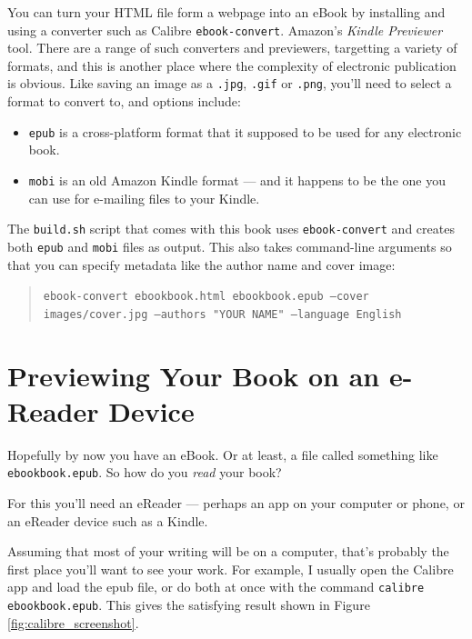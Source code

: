 You can turn your HTML file form a webpage into an eBook by installing
and using a converter such as Calibre \texttt{ebook-convert}.
Amazon's {\em Kindle Previewer} tool.
There are a range of such converters and previewers, targetting a
variety of formats, and this is another place where the complexity of
electronic publication is obvious. Like saving an image as a
\texttt{.jpg}, \texttt{.gif} or \texttt{.png}, you'll need to select a
format to convert to, and options include:

\begin{itemize}
  \item \texttt{epub} is a cross-platform format that it supposed to
    be used for any electronic book.
  \item \texttt{mobi} is an old Amazon Kindle format --- and it
    happens to be the one you can use for e-mailing files to your Kindle.
\end{itemize}

The \texttt{build.sh} script that comes with this book uses
\texttt{ebook-convert} and creates both \texttt{epub} and
\texttt{mobi} files as output. This also takes command-line
arguments so that you can specify metadata like the author name
and cover image:

\begin{quote}
\footnotesize
\flushleft
\texttt{ebook-convert ebookbook.html ebookbook.epub --cover images/cover.jpg --authors "YOUR NAME" --language English}
\end{quote}

\section{Previewing Your Book on an e-Reader Device}

Hopefully by now you have an eBook. Or at least, a file called something like
\texttt{ebookbook.epub}. So how do you {\em read} your book?

For this you'll need an eReader --- perhaps an app on your computer or phone,
or an eReader device such as a Kindle.

Assuming that most of your writing will be on a computer, that's
probably the first place you'll want to see your work. For example, I
usually open the Calibre app and load the epub file, or do both at
once with the command \texttt{calibre ebookbook.epub}. This gives 
the satisfying result shown in Figure \ref{fig:calibre_screenshot}.

